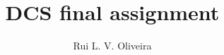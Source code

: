 \documentclass[a4paper,twoside,twocolumn]{article}
\title{DCS final assignment}
\author{Rui L. V. Oliveira}
\begin{document}


\pagebreak
\printbibliography
\end{document}
